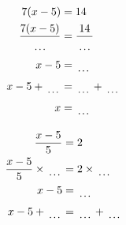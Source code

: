 \documentclass[12pt]{article}
\newcounter{minipagecount}
\begin{document}
\begin{multicols}{2}
\begin{minipage}[t]{0.45\textwidth}
    \raggedright %
    \begin{align*} %
        7(x - 5) &= 14\\
        \frac{7(x-5)}{\dotuline{\hspace{5mm}}} &= \frac{14}{\dotuline{\hspace{5mm}}}\\
        x - 5 &= \dotuline{\hspace{5mm}}\\
        x - 5 + \dotuline{\hspace{5mm}} &= \dotuline{\hspace{5mm}} + \dotuline{\hspace{5mm}}\\
        x &= \dotuline{\hspace{5mm}}\\
    \end{align*}
\end{minipage}\newpage
\noindent{(\theminipagecount)}\hspace{0.1mm} %
\begin{minipage}[t]{0.45\textwidth} %
    \vspace{-26pt}  %
    \raggedright %
    \begin{align*} %
        \frac{x - 5}{5} &= 2\\
        \frac{x - 5}{5} \times\dotuline{\hspace{5mm}} &= 2 \times\dotuline{\hspace{5mm}}\\
        x - 5 &= \dotuline{\hspace{5mm}}\\
        x - 5 + \dotuline{\hspace{5mm}} &= \dotuline{\hspace{5mm}} + \dotuline{\hspace{5mm}}\\

\end{align*}
\end{minipage}
\end{multicols}
\end{document}
